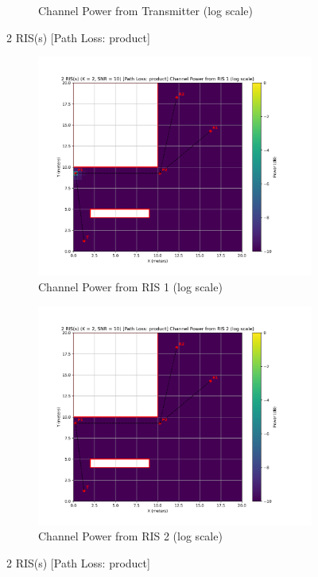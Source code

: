 \begin{figure}[H]
\begin{subfigure}[b]{0.48\textwidth}
    \caption{Channel Power from Transmitter (log scale)}
  \end{subfigure}
  \caption{2 RIS(s) [Path Loss: product]}
  \medskip
  \centering
  \begin{subfigure}[b]{0.48\textwidth}
    \centering
    \includegraphics[width=\textwidth]{imgs/heatmap-simulations/2 RIS(s) (K = 2, SNR = 10) [Path Loss_ product] Channel Power from RIS 1 (log scale).png}
    \caption{Channel Power from RIS 1 (log scale)}
  \end{subfigure}
  \hfill
  \begin{subfigure}[b]{0.48\textwidth}
    \centering
    \includegraphics[width=\textwidth]{imgs/heatmap-simulations/2 RIS(s) (K = 2, SNR = 10) [Path Loss_ product] Channel Power from RIS 2 (log scale).png}
    \caption{Channel Power from RIS 2 (log scale)}
  \end{subfigure}
  \caption{2 RIS(s) [Path Loss: product]}
\end{figure}

